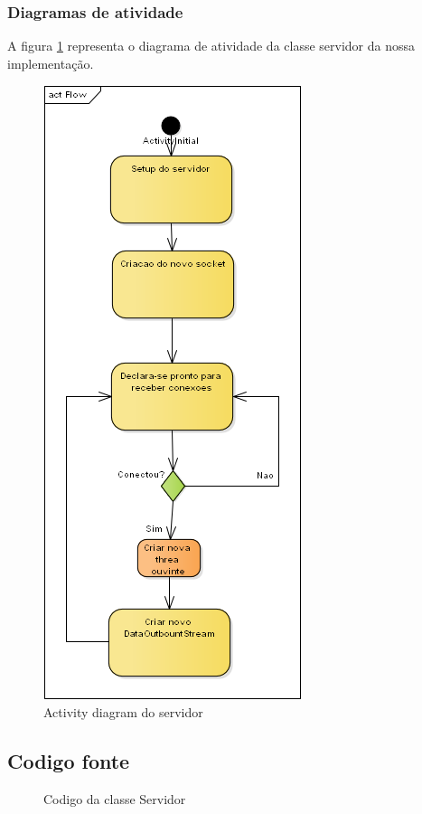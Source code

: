 \documentclass[a4paper,12pt]{article}
\begin{document}
\subsubsection{Diagramas de atividade}
A figura \ref{fig3} representa o diagrama de atividade da classe servidor da nossa
implementação.
\begin{figure}[H]
\centering
\includegraphics[scale=0.4]{img/serverflow.png}    
\caption{Activity diagram do servidor}

\label{fig3}
\end{figure}

\subsection{Codigo fonte}

\begin{figure}[H]

\caption{Codigo da classe Servidor}
\end{figure}
\end{document}

